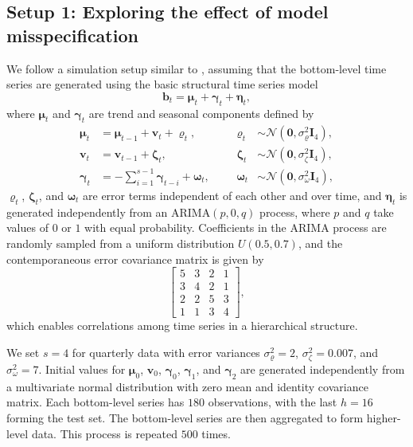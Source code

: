 \documentclass[
  11pt]{article}
\theoremstyle{plain}
\theoremstyle{remark}
\begin{document}
\subsection{Setup 1: Exploring the effect of model
misspecification}\label{sec-sim1}

We follow a simulation setup similar to \citet{Wickramasuriya2019-fc},
assuming that the bottom-level time series are generated using the basic
structural time series model \[
\bm{b}_t=\bm{\mu}_t+\bm{\gamma}_t+\bm{\eta}_t,
\] where \(\bm{\mu}_t\) and \(\bm{\gamma}_t\) are trend and seasonal
components defined by \begin{align*}
\bm{\mu}_t & =\bm{\mu}_{t-1}+\bm{v}_t+\bm{\varrho}_t, &&& \bm{\varrho}_t & \sim \mathcal{N}\left(\bm{0}, \sigma_{\varrho}^2 \bm{I}_4\right), \\
\bm{v}_t & =\bm{v}_{t-1}+\bm{\zeta}_t, &&& \bm{\zeta}_t & \sim \mathcal{N}\left(\bm{0}, \sigma_\zeta^2 \bm{I}_4\right), \\
\bm{\gamma}_t & =-\sum_{i=1}^{s-1} \bm{\gamma}_{t-i}+\bm{\omega}_t, &&& \bm{\omega}_t & \sim \mathcal{N}\left(\bm{0}, \sigma_\omega^2 \bm{I}_4\right),
\end{align*} \(\bm{\varrho}_t\), \(\bm{\zeta}_t\), and \(\bm{\omega}_t\)
are error terms independent of each other and over time, and
\(\bm{\eta}_t\) is generated independently from an
\(\text{ARIMA}(p,0,q)\) process, where \(p\) and \(q\) take values of
\(0\) or \(1\) with equal probability. Coefficients in the ARIMA process
are randomly sampled from a uniform distribution \(U(0.5, 0.7)\), and
the contemporaneous error covariance matrix is given by \[
\left[\begin{array}{llll}
5 & 3 & 2 & 1 \\
3 & 4 & 2 & 1 \\
2 & 2 & 5 & 3 \\
1 & 1 & 3 & 4
\end{array}\right],
\] which enables correlations among time series in a hierarchical
structure.

We set \(s = 4\) for quarterly data with error variances
\(\sigma_{\varrho}^2=2\), \(\sigma_\zeta^2=0.007\), and
\(\sigma_\omega^2=7\). Initial values for \(\bm{\mu}_0\), \(\bm{v}_0\),
\(\bm{\gamma}_0\), \(\bm{\gamma}_1\), and \(\bm{\gamma}_2\) are
generated independently from a multivariate normal distribution with
zero mean and identity covariance matrix. Each bottom-level series has
\(180\) observations, with the last \(h = 16\) forming the test set. The
bottom-level series are then aggregated to form higher-level data. This
process is repeated \(500\) times.
\end{document}
